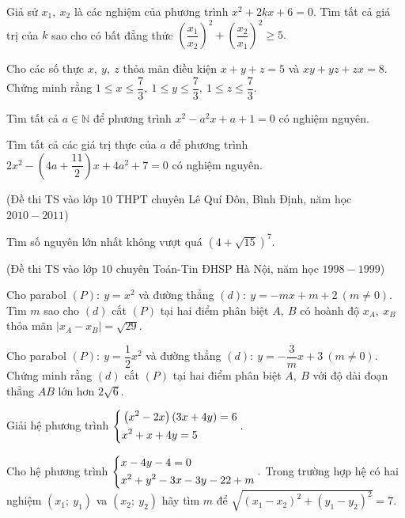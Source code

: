 \begin{bt}%
Giả sử $x_1,~x_2$ là các nghiệm của phương trình $x^2+2kx+6=0.$ Tìm tất cả giá trị của $k$ sao cho có bất đẳng thức $\left(\dfrac{x_1}{x_2}\right)^2+\left(\dfrac{x_2}{x_1}\right)^2 \geqslant 5.$	
\end{bt}
\begin{bt}%
Cho các số thực $x,~y,~z$ thỏa mãn điều kiện $x+y+z=5$ và $xy+yz+zx=8.$ Chứng minh rằng
$1 \leqslant x \leqslant \dfrac{7}{3},~1 \leqslant y \leqslant \dfrac{7}{3},~1 \leqslant z \leqslant \dfrac{7}{3}.$	
\end{bt}
\begin{bt}%
Tìm tất cả $a \in \mathbb{N}$ để phương trình $x^2-a^2x+a+1=0$ có nghiệm nguyên.	
\end{bt}
\begin{bt}%
Tìm tất cả các giá trị thực của $a$ để phương trình $2x^2-\left(4a+\dfrac{11}{2}\right)x+4a^2+7=0$ có nghiệm nguyên.
\begin{center}
	(Đề thi TS vào lớp $10$ THPT chuyên Lê Quí Đôn, Bình Định, năm học $2010-2011$)
\end{center}	
\end{bt}
\begin{bt}%
Tìm số nguyên lớn nhất không vượt quá $\left(4+\sqrt{15}\right)^7.$
\begin{center}
	(Đề thi TS vào lớp $10$ chuyên Toán-Tin ĐHSP Hà Nội, năm học $1998-1999$)
\end{center}
\end{bt}
\begin{bt}%
	Cho parabol $(P):~y=x^2$ và đường thẳng $(d):~y=-mx+m+2~(m \ne 0).$ Tìm $m$ sao cho $(d)$ cắt $(P)$ tại hai điểm phân biệt $A,~B$ có hoành độ $x_A,~x_B$ thỏa mãn $\left|x_A-x_B\right|=\sqrt{29}.$
\end{bt}
\begin{bt}%
	Cho parabol $(P):~y=\dfrac{1}{2}x^2$ và đường thẳng $(d):~y=-\dfrac{3}{m}x+3~(m \ne 0).$ Chứng minh rằng $(d)$ cắt $(P)$ tại hai điểm phân biệt $A,~B$ với độ dài đoạn thẳng $AB$ lớn hơn $2\sqrt{6}.$
\end{bt}
\begin{bt}%
Giải hệ phương trình $\left\{\begin{aligned}& \left(x^2-2x\right)\left(3x+4y\right)=6\\& x^2+x+4y=5 \end{aligned}\right..$	
\end{bt}
\begin{bt}%
	Cho hệ phương trình $\left\{\begin{aligned}& x-4y-4=0\\& x^2+y^2-3x-3y-22+m \end{aligned}\right..$ Trong trường hợp hệ có hai nghiệm $\left(x_1;~y_1\right)$ va $\left(x_2;~y_2\right)$ hãy tìm $m$ để $\sqrt{\left(x_1-x_2\right)^2+\left(y_1-y_2\right)^2}=7.$	
\end{bt}




